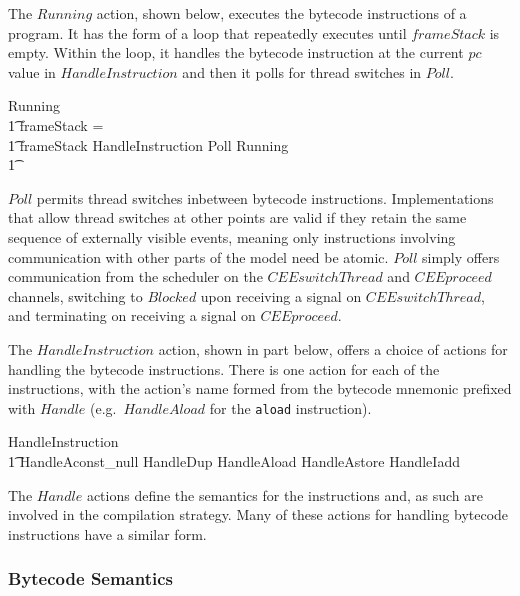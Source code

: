 The $Running$ action, shown below, executes the bytecode instructions
of a program. 
It has the form of a loop that repeatedly executes until $frameStack$
is empty.
Within the loop, it handles the bytecode instruction at the current
$pc$ value in $HandleInstruction$ and then it polls for thread
switches in $Poll$.
\begin{circusaction}
  Running \circdef \\
  \t1 \circif frameStack = \emptyset \circthen \Skip \\
  \t1 {} \circelse frameStack \neq \emptyset \circthen HandleInstruction \circseq Poll \circseq Running \\
  \t1 \circfi
\end{circusaction}
$Poll$ permits thread switches inbetween bytecode instructions.
Implementations that allow thread switches at other points are valid
if they retain the same sequence of externally visible events, meaning
only instructions involving communication with other parts of the
model need be atomic.
$Poll$ simply offers communication from the scheduler on the
$CEEswitchThread$ and $CEEproceed$ channels, switching to $Blocked$
upon receiving a signal on $CEEswitchThread$, and terminating on
receiving a signal on $CEEproceed$.

The $HandleInstruction$ action, shown in part below, offers a choice
of actions for handling the bytecode instructions.
There is one action for each of the instructions, with the action's
name formed from the bytecode mnemonic prefixed with $Handle$ (e.g.\
$HandleAload$ for the \texttt{aload} instruction).
{\setlength{\zedtab}{0.5cm}
\begin{circusaction}
	HandleInstruction \circdef \\
	\t1 HandleAconst\_null \extchoice HandleDup \extchoice HandleAload \extchoice HandleAstore \extchoice HandleIadd \extchoice {} \cdots
\end{circusaction}}

The $Handle$ actions define the semantics for the instructions and, as
such are involved in the compilation strategy.
Many of these actions for handling bytecode instructions have a
similar form.

\subsubsection*{Bytecode Semantics}

